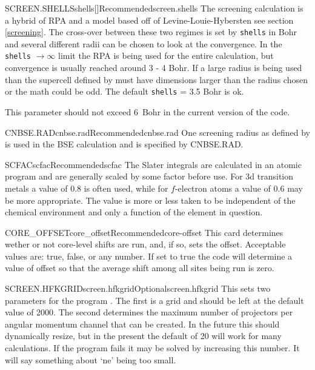 \documentclass[11pt]{report}
\begin{document}
\begin{Card}{SCREEN.SHELLS}{shells[]}{Recommended}{screen.shells}
The screening calculation is a hybrid of RPA and a model based off of Levine-Louie-Hybersten see section \ref{screening}. The cross-over between these two regimes is set by \texttt{shells} in Bohr and several different radii can be chosen to look at the convergence. In the \texttt{shells} $\rightarrow \infty$ limit the RPA is being used for the entire calculation, but convergence is usually reached around 3 - 4 Bohr. If a large radius is being used than the supercell defined by  must have dimensions larger than the radius chosen or the math could be odd. The default \texttt{shells} = 3.5 Bohr is ok.

This parameter should not exceed 6~Bohr in the current version of the code.
\end{Card}

\begin{Card}{CNBSE.RAD}{cnbse.rad}{Recommended}{cnbse.rad}
One screening radius as defined by  is used in the BSE calculation and is specified by CNBSE.RAD. 
\end{Card}

\begin{Card}{SCFAC}{scfac}{Recommended}{scfac}
The Slater integrals are calculated in an atomic program and are generally scaled by some factor before use. For 3d transition metals a value of $0.8$ is often used, while for $f$-electron atoms a value of $0.6$ may be more appropriate. The value is more or less taken to be independent of the chemical environment and only a function of the element in question.
\end{Card}

\begin{Card}{CORE\_OFFSET}{core\_offset}{Recommended}{core-offset}
This card determines wether or not core-level shifts are run, and, if so, sets the offset. Acceptable values are: true, false, or any number. If set to true the code will determine a value of offset so that the average shift among all sites being run is zero. 
\end{Card}

\begin{Card}{SCREEN.HFKGRID}{screen.hfkgrid}{Optional}{screen.hfkgrid}
This sets two parameters for the program . The first is a grid and should be left at the default value of 2000. The second determines the maximum number of projectors per angular momentum channel that can be created. In the future this should dynamically resize, but in the present the default of 20 will work for many calculations. If the program  fails it may be solved by increasing this number. It will say something about `ne' being too small. 
\end{Card}
\end{document}
